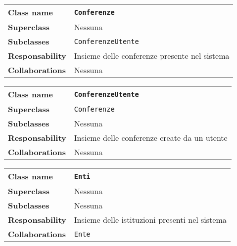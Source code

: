 \begin{table}[h!]
	\begin{tabular}{|l|l|}
		\hline 
		\textbf{Class name} & \texttt{Conferenze}
		\\ \hline
		\textbf{Superclass} & Nessuna
		\\ \hline
		\multirow{1}{*}{\textbf{Subclasses}} & \texttt{ConferenzeUtente} \\ \hline
		\textbf{Responsability} & Insieme delle conferenze presente nel sistema
		\\ \hline
		\multirow{1}{*}{\textbf{Collaborations}} & Nessuna
		\\ \hline
	\end{tabular}
\end{table}
\begin{table}[h!]
	\begin{tabular}{|l|l|}
		\hline 
		\textbf{Class name} & \texttt{ConferenzeUtente}
		\\ \hline
		\textbf{Superclass} & \texttt{Conferenze}
		\\ \hline
		\multirow{1}{*}{\textbf{Subclasses}} & Nessuna
		\\ \hline
		\textbf{Responsability} & Insieme delle conferenze create da un utente
		\\ \hline
		\multirow{1}{*}{\textbf{Collaborations}} & Nessuna
		\\ \hline
	\end{tabular}
\end{table}

\begin{table}[h!]
	\begin{tabular}{|l|l|}
		\hline 
		\textbf{Class name} & \texttt{Enti}
		\\ \hline
		\textbf{Superclass} & Nessuna
		\\ \hline
		\multirow{1}{*}{\textbf{Subclasses}} & Nessuna
		\\ \hline
		\textbf{Responsability} & Insieme delle istituzioni presenti nel sistema
		\\ \hline
		\multirow{1}{*}{\textbf{Collaborations}} & \texttt{Ente}
		\\ \hline
	\end{tabular}
\end{table}

